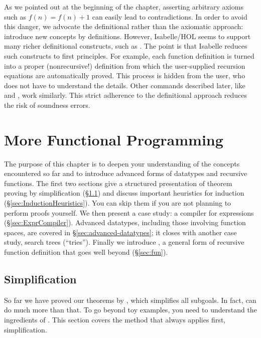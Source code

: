 %
As we pointed out at the beginning of the chapter, asserting arbitrary
axioms such as $f(n) = f(n) + 1$ can easily lead to contradictions. In order
to avoid this danger, we advocate the definitional rather than
the axiomatic approach: introduce new concepts by definitions. However,  Isabelle/HOL seems to
support many richer definitional constructs, such as
. The point is that Isabelle reduces such constructs to first principles. For example, each
 function definition is turned into a proper
(nonrecursive!) definition from which the user-supplied recursion equations are
automatically proved.  This process is
hidden from the user, who does not have to understand the details.  Other commands described
later, like  and , work similarly.  
This strict adherence to the definitional approach reduces the risk of 
soundness errors.

\chapter{More Functional Programming}

The purpose of this chapter is to deepen your understanding of the
concepts encountered so far and to introduce advanced forms of datatypes and
recursive functions. The first two sections give a structured presentation of
theorem proving by simplification ({\S}\ref{sec:Simplification}) and discuss
important heuristics for induction ({\S}\ref{sec:InductionHeuristics}).  You can
skip them if you are not planning to perform proofs yourself.
We then present a case
study: a compiler for expressions ({\S}\ref{sec:ExprCompiler}). Advanced
datatypes, including those involving function spaces, are covered in
{\S}\ref{sec:advanced-datatypes}; it closes with another case study, search
trees (``tries'').  Finally we introduce , a general
form of recursive function definition that goes well beyond 
 ({\S}\ref{sec:fun}).


\section{Simplification}
\label{sec:Simplification}

So far we have proved our theorems by , which simplifies
all subgoals. In fact,  can do much more than that. 
To go beyond toy examples, you
need to understand the ingredients of .  This section covers the
method that  always applies first, simplification.

